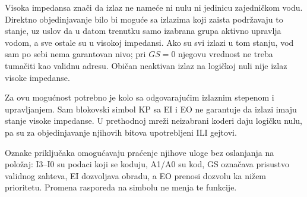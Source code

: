 
Visoka impedansa znači da izlaz ne nameće ni nulu ni jedinicu zajedničkom vodu. Direktno objedinjavanje bilo bi moguće sa izlazima koji zaista podržavaju to stanje, uz uslov da u datom trenutku samo izabrana grupa aktivno upravlja vodom, a sve ostale su u visokoj impedansi. Ako su svi izlazi u tom stanju, vod sam po sebi nema garantovan nivo; pri \(GS=0\) njegovu vrednost ne treba tumačiti kao validnu adresu. Običan neaktivan izlaz na logičkoj nuli nije izlaz visoke impedanse.

Za ovu mogućnost potrebno je kolo sa odgovarajućim izlaznim stepenom i upravljanjem. Sam blokovski simbol KP sa EI i EO ne garantuje da izlazi imaju stanje visoke impedanse. U prethodnoj mreži neizabrani koderi daju logičku nulu, pa su za objedinjavanje njihovih bitova upotrebljeni ILI gejtovi.

Oznake priključaka omogućavaju praćenje njihove uloge bez oslanjanja na položaj: I3--I0 su podaci koji se koduju, A1/A0 su kod, GS označava prisustvo validnog zahteva, EI dozvoljava obradu, a EO prenosi dozvolu ka nižem prioritetu. Promena rasporeda na simbolu ne menja te funkcije.
